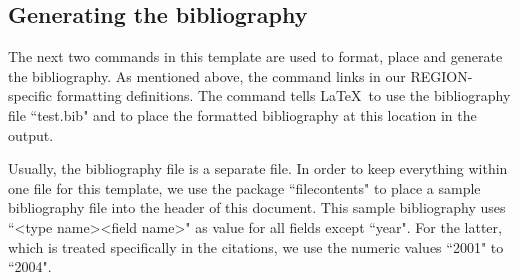 \documentclass[a4paper,twoside]{article}
\begin{document}
\subsection{Generating the bibliography}
\label{sec:5.5}

The next two commands in this template are used to format, place and generate the bibliography. As mentioned above, the command \verb|| links in our REGION-specific formatting definitions. The command \verb|| tells \LaTeX\ to use the bibliography file ``test.bib" and to place the formatted bibliography at this location in the output.

Usually, the bibliography file is a separate file. In order to keep everything within one file for this template, we use the package ``filecontents" to place a sample bibliography file into the header of this document. This sample bibliography uses ``\textless type name\textgreater \textless field name\textgreater " as value for all fields except ``year". For the latter, which is treated specifically in the citations, we use the numeric values ``2001" to ``2004".



\end{document}
